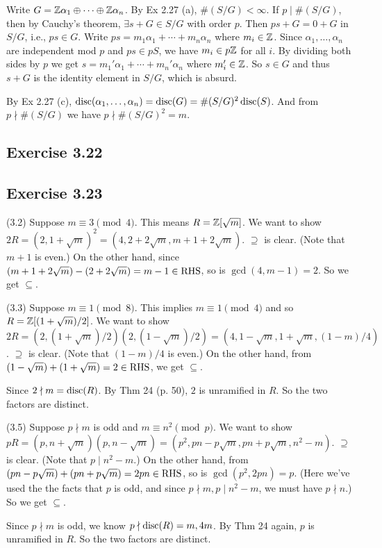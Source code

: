 \documentclass[../Marcus.tex]{subfiles}
\begin{document}
Write $G=\mathbb{Z}\alpha_1\oplus\cdots\oplus\mathbb{Z}\alpha_n$. By Ex 2.27 (a), $\#(S/G)<\infty$. If $p\mid \#(S/G)$, then by Cauchy's theorem, $\exists s+G\in S/G$ with order $p$. Then $ps+G=0+G$ in $S/G$, i.e., $ps\in G$. Write $ps=m_1\alpha_1+\cdots+m_n\alpha_n$ where $m_i\in\mathbb{Z}$. Since $\alpha_1,\ldots,\alpha_n$ are independent mod $p$ and $ps\in pS$, we have $m_i\in p\mathbb{Z}$ for all $i$. By dividing both sides by $p$ we get $s=m_1'\alpha_1+\cdots+m_n'\alpha_n$ where $m'_i\in\mathbb{Z}$. So $s\in G$ and thus $s+G$ is the identity element in $S/G$, which is absurd.

By Ex 2.27 (c), $\operatorname{disc}(\alpha_1,\ldots,\alpha_n)=\operatorname{disc}(G)=\#(S/G)^2\operatorname{disc}(S)$. And from $p\nmid \#(S/G)$ we have $p\nmid \#(S/G)^2=m$.

\subsection*{Exercise 3.22}

\subsection*{Exercise 3.23}

(3.2) Suppose $m\equiv 3\pmod{4}$. This means $R=\mathbb{Z}[\sqrt{m}]$. We want to show $2R=(2,1+\sqrt{m})^2=(4,2+2\sqrt{m},m+1+2\sqrt{m})$. $\supseteq$ is clear. (Note that $m+1$ is even.) On the other hand,
since $(m+1+2\sqrt{m})-(2+2\sqrt{m})=m-1\in\operatorname{RHS}$, so is $\gcd(4,m-1)=2$. So we get $\subseteq$.

(3.3) Suppose $m\equiv 1\pmod{8}$. This implies $m\equiv 1\pmod{4}$ and so $R=\mathbb{Z}[{(1+\sqrt{m})/2}]$. We want to show $2R=(2,(1+\sqrt{m})/2)(2,(1-\sqrt{m})/2)=(4,1-\sqrt{m},1+\sqrt{m},(1-m)/4)$. $\supseteq$ is clear. (Note that $(1-m)/4$ is even.) On the other hand, from $(1-\sqrt{m})+(1+\sqrt{m})=2\in\operatorname{RHS}$, we get $\subseteq$.

Since $2\nmid m=\operatorname{disc}(R)$. By Thm 24 (p. 50), $2$ is unramified in $R$. So the two factors are distinct.

(3.5) Suppose $p\nmid m$ is odd and $m\equiv n^2\pmod{p}$. We want to show $pR=(p,n+\sqrt{m})(p,n-\sqrt{m})=(p^2,pn-p\sqrt{m},pn+p\sqrt{m},n^2-m)$. $\supseteq$ is clear. (Note that $p\mid n^2-m$.) On the other hand, from $(pn-p\sqrt{m})+(pn+p\sqrt{m})=2pn\in\operatorname{RHS}$, so is $\gcd(p^2,2pn)=p$. (Here we've used the the facts that $p$ is odd, and since $p\nmid m,p\mid n^2-m$, we must have $p\nmid n$.) So we get $\subseteq$.

Since $p\nmid m$ is odd, we know $p\nmid\operatorname{disc}(R)=m,4m$. By Thm 24 again, $p$ is unramified in $R$. So the two factors are distinct.
\end{document}
